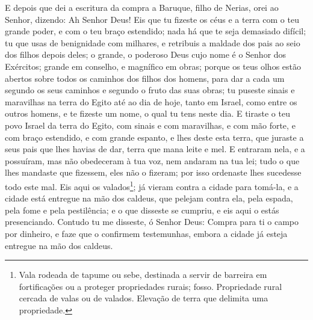E depois que dei a escritura da compra a Baruque, filho de
Nerias, orei ao Senhor, dizendo: Ah Senhor Deus! Eis que tu
fizeste os céus e a terra com o teu grande poder, e com o teu braço
estendido; nada há que te seja demasiado difícil; tu que usas
de benignidade com milhares, e retribuis a maldade dos pais ao seio
dos filhos depois deles; o grande, o poderoso Deus cujo nome é o
Senhor dos Exércitos; grande em conselho, e magnífico em
obras; porque os teus olhos estão abertos sobre todos os caminhos
dos filhos dos homens, para dar a cada um segundo os seus caminhos e
segundo o fruto das suas obras; tu puseste sinais e
maravilhas na terra do Egito até ao dia de hoje, tanto em Israel,
como entre os outros homens, e te fizeste um nome, o qual tu tens
neste dia. E tiraste o teu povo Israel da terra do Egito, com
sinais e com maravilhas, e com mão forte, e com braço estendido, e
com grande espanto, e lhes deste esta terra, que juraste a
seus pais que lhes havias de dar, terra que mana leite e mel.
E entraram nela, e a possuíram, mas não obedeceram à tua voz,
nem andaram na tua lei; tudo o que lhes mandaste que fizessem, eles
não o fizeram; por isso ordenaste lhes sucedesse todo este mal.
Eis aqui os valados\footnote{Vala rodeada de tapume ou sebe,
destinada a servir de barreira em fortificações ou a proteger
propriedades rurais; fosso. Propriedade rural cercada de valas ou de
valados. Elevação de terra que delimita uma propriedade.}; já vieram
contra a cidade para tomá-la, e a cidade está entregue na mão dos
caldeus, que pelejam contra ela, pela espada, pela fome e pela
pestilência; e o que disseste se cumpriu, e eis aqui o estás
presenciando. Contudo tu me disseste, ó Senhor Deus: Compra
para ti o campo por dinheiro, e faze que o confirmem testemunhas,
embora a cidade já esteja entregue na mão dos caldeus.

